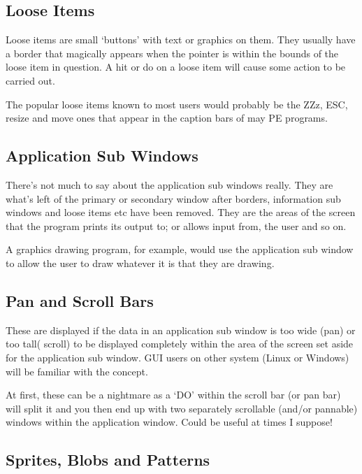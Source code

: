 \subsection{Loose Items}
\label{ch22-loose}%

Loose items are small `buttons' with text or graphics on them.
      They usually have a border that magically appears when the pointer is
      within the bounds of the loose item in question. A hit or do on a loose
      item will cause some action to be carried out.

The popular loose items known to most users would probably be the
      ZZz, ESC, resize and move ones that appear in the caption bars of may
      PE programs.

\subsection{Application Sub Windows}
\label{ch22-app-sub-win}%

There's not much to say about the application sub windows really.
      They are what's left of the primary or secondary window after borders,
      information sub windows and loose items etc have been removed. They are
      the areas of the screen that the program prints its output to; or allows
      input from, the user and so on.

A graphics drawing program, for example, would use the application
      sub window to allow the user to draw whatever it is that they are
      drawing.

\subsection{Pan and Scroll Bars}
\label{ch22-pan-scroll}%

These are displayed if the data in an application sub window is
      too wide (pan) or too tall( scroll) to be displayed completely within
      the area of the screen set aside for the application sub window. GUI
      users on other system (Linux or Windows) will be familiar with the
      concept.

At first, these can be a nightmare as a `DO' within the scroll bar
      (or pan bar) will split it and you then end up with two separately
      scrollable (and/or pannable) windows within the application window.
      Could be useful at times I suppose!

\subsection{Sprites, Blobs and Patterns}
\label{ch22-sprites}%

